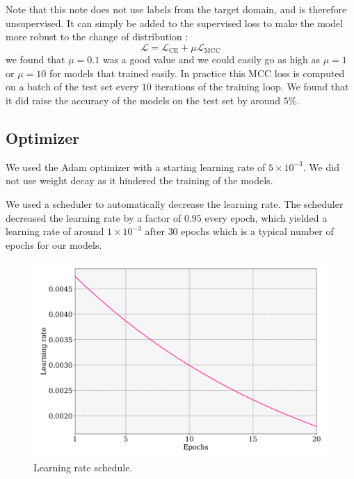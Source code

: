 \documentclass[switch, 11pt]{article}
\begin{document}
\begin{multicols}{2}
    Note that this note does not use labels from the target domain, and is therefore unsupervised. It can simply be added to the supervised loss to make the model more robust to the change of distribution :
    \begin{equation}
        \mathcal{L} = \mathcal{L}_{\text{CE}} + \mu\mathcal{L}_{\text{MCC}}
    \end{equation}
    we found that $\mu=0.1$ was a good value and we could easily go as high as $\mu=1$ or $\mu=10$ for models that trained easily. In practice this MCC loss is computed on a batch of the test set every $10$ iterations of the training loop. We found that it did raise the accuracy of the models on the test set by around $5\%$.

    \subsection{Optimizer}

    We used the Adam optimizer with a starting learning rate of $5\times10^{-3}$. We did not use weight decay as it hindered the training of the models.

    We used a scheduler to automatically decrease the learning rate. The scheduler decreased the learning rate by a factor of $0.95$ every epoch, which yielded a learning rate of around $1\times10^{-3}$ after $30$ epochs which is a typical number of epochs for our models.

    \begin{figure}[H]
        \centering
        \includegraphics[width=\columnwidth]{figures/learning_rate.png}
        \caption{Learning rate schedule.}
        \label{fig:learning_rate}
    \end{figure}


\end{multicols}
\end{document}
